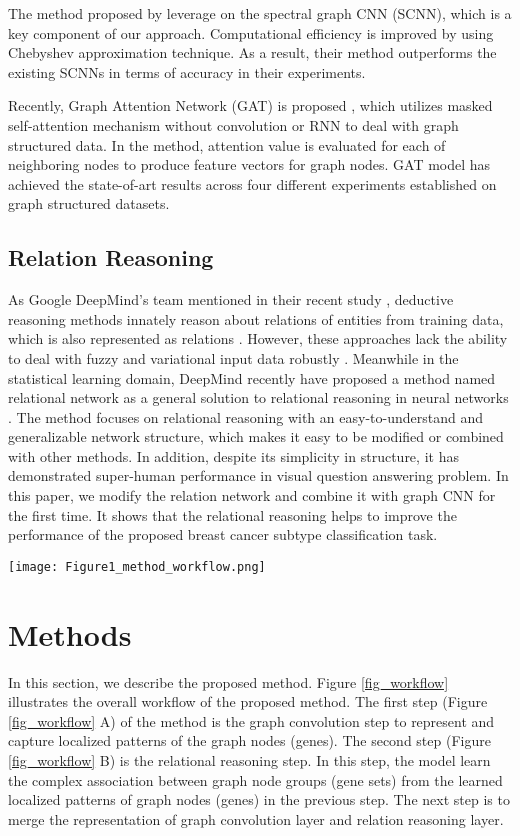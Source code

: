 \documentclass{article}
\begin{document}
The method proposed by \citeauthor{defferrard2016convolutional} leverage on the spectral graph CNN (SCNN), which is a key component of our approach. Computational efficiency is improved by using Chebyshev approximation technique. As a result, their method outperforms the existing SCNNs in terms of accuracy in their experiments.

Recently, Graph Attention Network (GAT) is proposed \cite{velivckovic2017graph}, which utilizes masked self-attention mechanism without convolution or RNN to deal with graph structured data. In the method, attention value is evaluated for each of neighboring nodes to produce feature vectors for graph nodes. GAT model has achieved the state-of-art results across four different experiments established on graph structured datasets.

\subsection{Relation Reasoning}
As Google DeepMind's team mentioned in their recent study \cite{santoro2017simple}, deductive reasoning methods innately reason about relations of entities from training data, which is also represented as relations \cite{quinlan1990learning}. However, these approaches lack the ability to deal with fuzzy and variational input data robustly \cite{harnad1990symbol}. Meanwhile in the statistical learning domain, DeepMind recently have proposed a method named relational network as a general solution to relational reasoning in neural networks \cite{santoro2017simple}.
The method focuses on relational reasoning with an easy-to-understand and generalizable network structure, which makes it easy to be modified or combined with other methods. In addition, despite its simplicity in structure, it has demonstrated super-human performance in visual question answering problem. In this paper, we modify the relation network and combine it with graph CNN for the first time. It shows that the relational reasoning helps to improve the performance of the proposed breast cancer subtype classification task.

\begin{figure*}[!t]
\centering
\texttt{[image: Figure1\_method\_workflow.png]}
\caption{Overview of the proposed method}
\label{fig_workflow}
\end{figure*}

\section{Methods}
In this section, we describe the proposed method. Figure \ref{fig_workflow} illustrates the overall workflow of the proposed method.
The first step (Figure \ref{fig_workflow} A) of the method is the graph convolution step to represent and capture localized patterns of the graph nodes (genes). The second step (Figure \ref{fig_workflow} B) is the relational reasoning step. In this step, the model learn the complex association between graph node groups (gene sets) from the learned localized patterns of graph nodes (genes) in the previous step. The next step is to merge the representation of graph convolution layer and relation reasoning layer.
\end{document}
